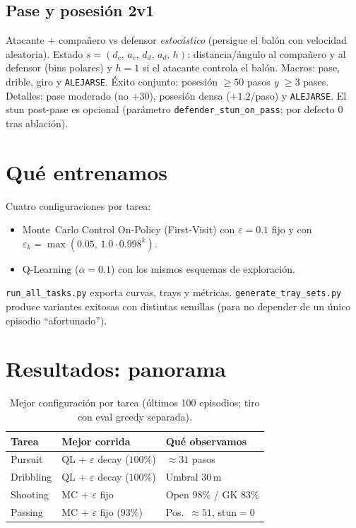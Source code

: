 \documentclass[11pt,a4paper]{article}
\begin{document}
\subsection{Pase y posesión 2v1}
Atacante + compañero vs defensor \emph{estocástico} (persigue el balón con velocidad aleatoria).
Estado $s=(d_c,\,a_c,\,d_d,\,a_d,\,h)$: distancia/ángulo al compañero y al defensor (bins polares) y $h=1$ si el atacante controla el balón.
Macros: pase, drible, giro y \texttt{ALEJARSE}.
Éxito conjunto: posesión $\ge 50$ pasos \emph{y} $\ge 3$ pases.
Detalles: pase moderado (no $+30$), posesión densa ($+1.2$/paso) y \texttt{ALEJARSE}.
El stun post-pase es opcional (parámetro \texttt{defender\_stun\_on\_pass}; por defecto $0$ tras ablación).

\section{Qué entrenamos}
Cuatro configuraciones por tarea:
\begin{itemize}
    \item Monte~Carlo Control On-Policy (First-Visit) con $\varepsilon=0.1$ fijo
          y con $\varepsilon_k=\max(0.05,\,1.0\cdot 0.998^{k})$.
    \item Q-Learning ($\alpha=0.1$) con los mismos esquemas de exploración.
\end{itemize}
\texttt{run\_all\_tasks.py} exporta curvas, trays y métricas.
\texttt{generate\_tray\_sets.py} produce variantes exitosas con distintas semillas
(para no depender de un único episodio ``afortunado'').

\section{Resultados: panorama}
\begin{table}[htbp]
\centering
\small
\begin{tabular}{@{}llp{5.2cm}@{}}
\toprule
Tarea & Mejor corrida & Qué observamos \\
\midrule
Pursuit & QL + $\varepsilon$ decay ($100\%$) & $\approx 31$ pasos \\
Dribbling & QL + $\varepsilon$ decay ($100\%$) & Umbral 30\,m \\
Shooting & MC + $\varepsilon$ fijo & Open $98\%$ / GK $83\%$ \\
Passing & MC + $\varepsilon$ fijo ($93\%$) & Pos.\ $\approx 51$, stun$=0$ \\
\bottomrule
\end{tabular}
\caption{Mejor configuración por tarea (últimos 100 episodios; tiro con eval greedy separada).}
\end{table}
\end{document}

